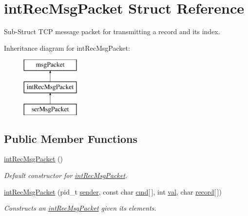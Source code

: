 \hypertarget{structintRecMsgPacket}{\section{int\-Rec\-Msg\-Packet Struct Reference}
\label{structintRecMsgPacket}
}


Sub-\/\-Struct T\-C\-P message packet for transmitting a record and its index.  


Inheritance diagram for int\-Rec\-Msg\-Packet\-:\begin{figure}[H]
\begin{center}
\leavevmode
\includegraphics[height=3.000000cm]{structintRecMsgPacket}
\end{center}
\end{figure}
\subsection*{Public Member Functions}
\begin{DoxyCompactItemize}
\item 
\hypertarget{structintRecMsgPacket_a2f337aa26e3c8bf95404e3958f306c3b}{\hyperlink{structintRecMsgPacket_a2f337aa26e3c8bf95404e3958f306c3b}{int\-Rec\-Msg\-Packet} ()}\label{structintRecMsgPacket_a2f337aa26e3c8bf95404e3958f306c3b}

\begin{DoxyCompactList}\small\item\em Default constructor for \hyperlink{structintRecMsgPacket}{int\-Rec\-Msg\-Packet}. \end{DoxyCompactList}\item 
\hyperlink{structintRecMsgPacket_af0017da02a0021d5674c88bfb9151f1e}{int\-Rec\-Msg\-Packet} (pid\-\_\-t \hyperlink{structmsgPacket_a294c1f456116eb9177b31ab8b5577f86}{sender}, const char \hyperlink{structmsgPacket_a8b49c124b4ca2ed872692333b71d74fd}{cmd}\mbox{[}$\,$\mbox{]}, int \hyperlink{structintRecMsgPacket_a09009e50e4f452b7fea038fcb5f8e382}{val}, char \hyperlink{structintRecMsgPacket_a4edab3e169d3d5d2ceced40d663e8055}{record}\mbox{[}$\,$\mbox{]})
\begin{DoxyCompactList}\small\item\em Constructs an \hyperlink{structintRecMsgPacket}{int\-Rec\-Msg\-Packet} given its elements. \end{DoxyCompactList}\end{DoxyCompactItemize}
